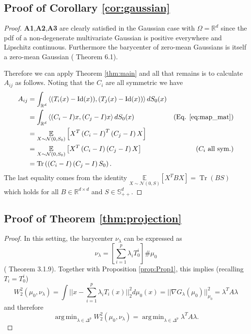 \documentclass[nohyperref]{article}
\DeclareMathOperator*{\argmin}{arg\,min}
\DeclareMathOperator*{\id}{Id}
\DeclareMathOperator{\Tr}{Tr}
\theoremstyle{definition}
\begin{document}
\subsection{Proof of Corollary \ref{cor:gaussian}}\label{SM:Cor1Proof}

\begin{proof}
    \textbf{A1},\textbf{A2},\textbf{A3} are clearly satisfied in the Gaussian case with $\Omega = \mathbb{R}^d$ since the pdf of a non-degenerate multivariate Gaussian is positive everywhere and Lipschitz continuous. Furthermore the barycenter of zero-mean Gaussians is itself a zero-mean Gaussian (\citep{agueh2011barycenters} Theorem 6.1).
    
    Therefore we can apply Theorem \ref{thm:main} and all that remains is to calculate $A_{ij}$ as follows. Noting that the $C_i$ are all symmetric \cite{agueh2011barycenters} we have
    \begin{align*}
    A_{ij} &= \int_{\mathbb{R}^d} \left \langle 
            (T_i(x) - \id(x)),
            (T_j(x) - \id(x)) 
        \right \rangle dS_0(x)  \\
    &= \int_{\mathbb{R}^d} \left \langle 
            (C_i - I)x, 
            (C_j - I)x 
        \right \rangle dS_0(x) & (\text{Eq. \ref{eq:map_mat}})  \\
    &= \underset{X \sim \mathcal{N}(0,S_0)}{\mathbb{E}}\left [ 
            X^T \left (C_i - I \right )^T 
            \left (C_j - I \right ) X 
        \right ]  \\
    &= \underset{X \sim \mathcal{N}(0,S_0)}{\mathbb{E}}\left [ 
            X^T \left (C_i - I \right ) 
            \left (C_j - I \right ) X 
        \right ]  & (C_i \text{ all sym.})  \\
    &= \Tr \left ( 
            \left (C_i - I \right ) 
            \left (C_j - I \right ) S_0 
        \right ).
\end{align*}
The last equality comes from the identity
$\underset{X \sim \mathcal{N}(0,S)}{\mathbb{E}}
    \left [ X^T B X \right ]  = \Tr(BS)$
which holds for all $B\in \mathbb{R}^{d\times d}$ and $S \in \mathbb{S}^d_{++}.$
\end{proof}

\subsection{Proof of Theorem \ref{thm:projection}} \label{sec:projection}

\begin{proof}
    In this setting, the barycenter $\nu_\lambda$ can be expressed as
    $$
    \nu_\lambda = \left [ \sum_{i=1}^p \lambda_i T_0^i \right ] \# \mu_0
    $$
    (\cite{panaretos2020invitation} Theorem 3.1.9).  Together with Proposition \ref{prop:Prop1}, this implies (recalling $T_i = T_0^i$) 
    $$
    W_2^2(\mu_0, \nu_\lambda) = \int || x- \sum_{i=1}^p \lambda_i T_i(x) ||_2^2 d\mu_0(x) = ||\nabla G_{\lambda}(\mu_0)||_{\mu_0}^2 = \lambda^TA\lambda
    $$
    and therefore
    $$
    \argmin_{\lambda \in \Delta^p} W_2^2(\mu_0, \nu_{\lambda}) = \argmin_{\lambda \in \Delta^p} \lambda^TA\lambda.
    $$
\end{proof}
\end{document}
